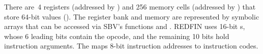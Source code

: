 




There are~4 registers (addressed by ) and 256 memory cells (addressed
by ) that store 64-bit values (). The register bank and
memory are represented by symbolic arrays
that can be accessed via SBV's functions  and .
REDFIN uses 16-bit s, whose 6 leading bits contain the
opcode, and the remaining 10 bits hold instruction arguments. The 
maps 8-bit instruction addresses to instruction codes.

